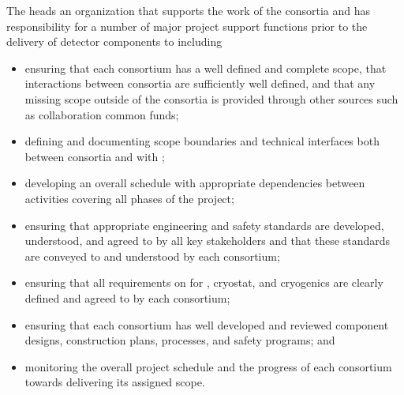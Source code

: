 The  heads an organization that supports the work of 
the consortia and has responsibility for a number of major project 
support functions prior to the delivery of detector components to 
 including
\begin{itemize}
\item ensuring that each consortium has a well defined and complete
  scope, that interactions between consortia are sufficiently 
  well defined, and that any missing scope outside of the 
  consortia is provided through other sources such as collaboration
  common funds;
\item defining and documenting scope boundaries and technical 
  interfaces both between consortia and with ;  
\item developing an overall schedule with appropriate dependencies
  between activities covering all phases of the project; 
\item ensuring that appropriate engineering and safety standards 
  are developed, understood, and agreed to by all key stakeholders 
  and that these standards are conveyed to and understood by each
  consortium;
\item ensuring that all  requirements on  
  for , cryostat, and cryogenics are clearly defined and 
  agreed to by each consortium;
\item ensuring that each consortium has well developed and reviewed
  component designs, construction plans,  processes, and 
  safety programs; and
\item monitoring the overall project schedule and the progress of 
  each consortium towards delivering its assigned scope. 
\end{itemize}

